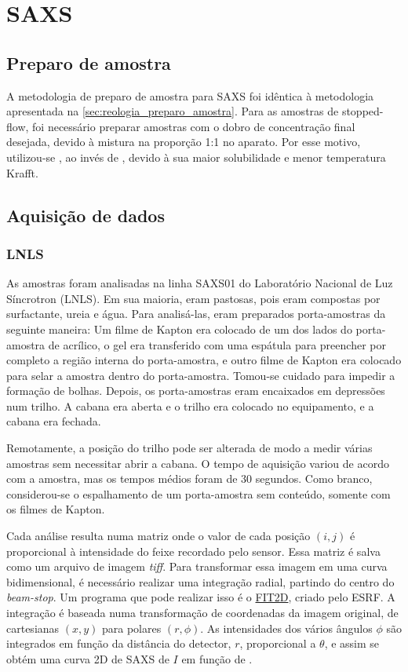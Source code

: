 	\chapter{SAXS} 
		\section{Preparo de amostra}
		
		A metodologia de preparo de amostra para SAXS foi idêntica à metodologia apresentada na \autoref{sec:reologia_preparo_amostra}. Para as amostras de stopped-flow, foi necessário preparar amostras com o dobro de concentração final desejada, devido à mistura na proporção 1:1 no aparato. Por esse motivo, utilizou-se \TTAB, ao invés de \CTAB, devido à sua maior solubilidade e menor temperatura Krafft.
		
		\section{Aquisição de dados}
			\subsection{LNLS} 
			
			As amostras foram analisadas na linha SAXS01 do Laboratório Nacional de Luz Síncrotron (LNLS). Em sua maioria, eram pastosas, pois eram compostas por surfactante, ureia e água. Para analisá-las, eram preparados porta-amostras da seguinte maneira: Um filme de Kapton era colocado de um dos lados do porta-amostra de acrílico, o gel era transferido com uma espátula para preencher por completo a região interna do porta-amostra, e outro filme de Kapton era colocado para selar a amostra dentro do porta-amostra. Tomou-se cuidado para impedir a formação de bolhas. Depois, os porta-amostras eram encaixados em depressões num trilho. A cabana era aberta e o trilho era colocado no equipamento, e a cabana era fechada.
					
			Remotamente, a posição do trilho pode ser alterada de modo a medir várias amostras sem necessitar abrir a cabana. O tempo de aquisição variou de acordo com a amostra, mas os tempos médios foram de 30 segundos. Como branco, considerou-se o espalhamento de um porta-amostra sem conteúdo, somente com os filmes de Kapton.
			
			Cada análise resulta numa matriz onde o valor de cada posição \((i, j)\) é proporcional à intensidade do feixe recordado pelo sensor. Essa matriz é salva como um arquivo de imagem \emph{tiff}. Para transformar essa imagem em uma curva bidimensional, é necessário realizar uma integração radial, partindo do centro do \emph{beam-stop}. Um programa que pode realizar isso é o \href{http://www.esrf.eu/computing/scientific/FIT2D/windows.html}{FIT2D}, criado pelo ESRF. A integração é baseada numa transformação de coordenadas da imagem original, de cartesianas \((x, y)\) para polares \((r, \phi)\). As intensidades dos vários ângulos \(\phi\) são integrados em função da distância do detector, \(r\), proporcional a \(\theta\), e assim se obtém uma curva 2D de SAXS de \(I\) em função de \q. 
			
